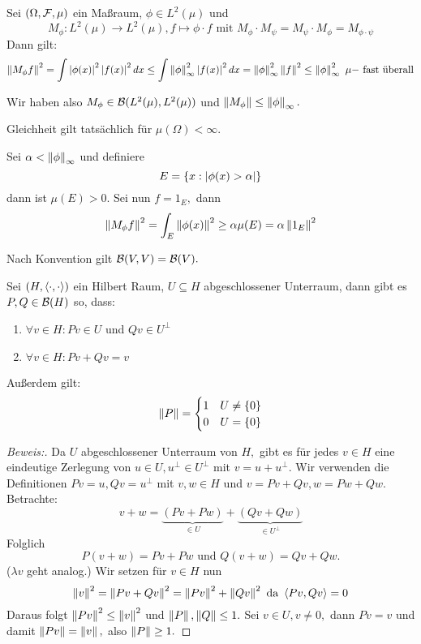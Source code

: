 \begin{ex}[Multiplikationsoperatoren] \label{Mult_op}
    Sei $(\Omega, \mathcal{F}, \mu)$ ein Maßraum, $\phi \in L^2(\mu)$ und \[M_{\phi}: L^2(\mu) \to L^2(\mu), f \mapsto \phi \cdot f \text{ mit } M_{\phi} \cdot M_{\psi} = M_{\psi} \cdot M_{\phi} = M_{\phi \cdot \psi}\] Dann gilt:
    \[\left\lVert M_{\phi}f\right\rVert^2 = \int \left\lvert \phi(x) \right\rvert^2 \left\lvert f(x) \right\rvert^2dx \leq \int \left\lVert\phi\right\rVert_\infty^2 \left\lvert f(x) \right\rvert^2dx = \left\lVert\phi\right\rVert_\infty^2\left\lVert f\right\rVert^2 \leq \left\lVert\phi\right\rVert_\infty^2 \text{ $\mu-$ fast überall}\]
    
    Wir haben also $M_{\phi} \in \mathcal{B}(L^2(\mu), L^2(\mu))$ und $\left\lVert M_{\phi}\right\rVert \leq \left\lVert\phi\right\rVert_\infty.$ 
    
    Gleichheit gilt tatsächlich für $\mu(\Omega) < \infty.$
    
    Sei $\alpha < \left\lVert\phi\right\rVert_\infty$ und definiere
    \[E = \left\{x: \left\lvert \phi(x) > \alpha \right\rvert\right\}\]
    dann ist $\mu(E)>0.$ Sei nun $f = 1_E,$ dann 
    \[\left\lVert M_{\phi}f\right\rVert^2 = \int_E \left\lVert\phi(x)\right\rVert^2 \geq \alpha \mu(E) = \alpha \left\lVert1_E\right\rVert^2\]
\end{ex}

\begin{rem}
    Nach Konvention gilt $\mathcal{B}(V, V) = \mathcal{B}(V).$
\end{rem}

\begin{theorem}
    Sei $(H, \left\langle\cdot, \cdot\right\rangle)$ ein Hilbert Raum, $U \subseteq H$ abgeschlossener Unterraum, dann gibt es $P, Q \in \mathcal{B}(H)$ so, dass:
    \label{PQ_Zerlegung}
    \begin{enumerate}
        \item $\forall v \in H: Pv \in U$ und $Qv \in U^{\perp}$
        \item $\forall v \in H: Pv + Qv = v$
    \end{enumerate}
    Außerdem gilt: 
    \[\left\lVert P\right\rVert = \begin{cases} 1 & U \not= \left\{0\right\} \\
    0 & U = \left\{0\right\}
    \end{cases}\]
    
    \begin{proof}[Beweis:] Da $U$ abgeschlossener Unterraum von $H,$ gibt es für jedes $v \in H$ eine eindeutige Zerlegung von $u \in U, u^{\perp} \in U^{\perp}$ mit $v = u + u^{\perp}.$ Wir verwenden die Definitionen $Pv = u, Qv = u^{\perp}$ mit $v, w \in H$ und $v = Pv + Qv, w = Pw + Qw.$ Betrachte: \[v + w = \underbrace{(Pv + Pw)}_{\in U} + \underbrace{(Qv + Qw)}_{\in U^{\perp}}\]
    Folglich \[P(v + w) = Pv + Pw \text{ und } Q(v+w) = Qv + Qw.\] ($\lambda v$ geht analog.) Wir setzen für $v \in H$ nun 
    \[\left\lVert v\right\rVert^2 = \left\lVert Pv + Qv\right\rVert^2 = \left\lVert Pv\right\rVert^2 + \left\lVert Qv\right\rVert^2 \text{ da } \left\langle Pv, Qv\right\rangle = 0\] Daraus folgt $\left\lVert Pv\right\rVert^2 \leq \left\lVert v\right\rVert^2$ und $\left\lVert P\right\rVert, \left\lVert Q\right\rVert \leq 1.$ Sei $v \in U, v \not= 0,$ dann $Pv = v$ und damit $\left\lVert Pv\right\rVert = \left\lVert v\right\rVert,$ also $\left\lVert P\right\rVert \geq 1.$
    \end{proof}
\end{theorem}

